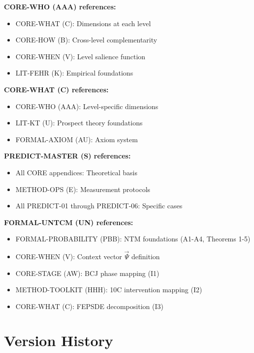 \begin{tcolorbox}[colback=yellow!5!white, colframe=yellow!75!black, 
    title=Key Cross-References]

\textbf{CORE-WHO (AAA) references:}
\begin{itemize}[nosep]
\item CORE-WHAT (C): Dimensions at each level
\item CORE-HOW (B): Cross-level complementarity
\item CORE-WHEN (V): Level salience function
\item LIT-FEHR (K): Empirical foundations
\end{itemize}

\textbf{CORE-WHAT (C) references:}
\begin{itemize}[nosep]
\item CORE-WHO (AAA): Level-specific dimensions
\item LIT-KT (U): Prospect theory foundations
\item FORMAL-AXIOM (AU): Axiom system
\end{itemize}

\textbf{PREDICT-MASTER (S) references:}
\begin{itemize}[nosep]
\item All CORE appendices: Theoretical basis
\item METHOD-OPS (E): Measurement protocols
\item All PREDICT-01 through PREDICT-06: Specific cases
\end{itemize}

\textbf{FORMAL-UNTCM (UN) references:}
\begin{itemize}[nosep]
\item FORMAL-PROBABILITY (PBB): NTM foundations (A1-A4, Theorems 1-5)
\item CORE-WHEN (V): Context vector $\vec{\Psi}$ definition
\item CORE-STAGE (AW): BCJ phase mapping (I1)
\item METHOD-TOOLKIT (HHH): 10C intervention mapping (I2)
\item CORE-WHAT (C): FEPSDE decomposition (I3)
\end{itemize}

\end{tcolorbox}

\section{Version History}
\label{sec:index-version}

